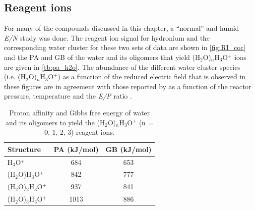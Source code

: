 \subsection{Reagent ions}\label{section:coc_RI}
For many of the compounds discussed in this chapter, a ``normal'' and humid \textit{E/N} study was done.
%
The reagent ion signal for hydronium and the corresponding water cluster for these two sets of data are shown in \autoref{fig:RI_coc} and the PA and GB of  the water and its oligomers that yield (H$_2$O)$_n$H$_3$O$^+$ ions are given in \autoref{tb:pa_h2o}.
%
The abundance of the different water cluster species (i.e. (H$_2$O)$_n$H$_3$O$^+$) as a function of the reduced electric field that is observed in these figures are in agreement with those reported by \citeauthor{price1977new} as a function of the  reactor pressure, temperature and the \textit{E/P} ratio \cite{price1977new}.



\begin{table}[htbp]
\centering
\caption{Proton affinity and Gibbs free energy of water and its oligomers to yield the (H$_2$O)$_n$H$_3$O$^+$ (n = 0, 1, 2, 3) reagent ions.}
\label{tb:pa_h2o}
\begin{tabular}{lcc}
\toprule
\textbf{Structure} &\textbf{PA (kJ/mol)} &\textbf{GB (kJ/mol)}\\ \toprule
H$_3$O$^+$              &684  &653       \\
(H$_2$O)H$_3$O$^+$      &842  &777       \\
(H$_2$O)$_2$H$_3$O$^+$  &937  &841       \\
(H$_2$O)$_3$H$_3$O$^+$  &1013  &886       \\
\bottomrule
\end{tabular}
\end{table}

